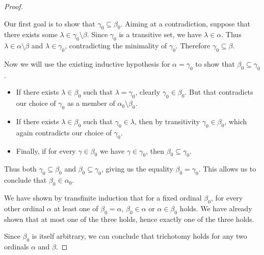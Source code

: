 \begin{proof}
\begin{itemize}
    Our first goal is to show that \( \gamma_0 \subseteq \beta_0 \). Aiming at a contradiction, suppose that there exists some \( \lambda \in \gamma_0 \setminus \beta \). Since \( \gamma_0 \) is a transitive set, we have \( \lambda \in \alpha \). Thus \( \lambda \in \alpha \setminus \beta \) and \( \lambda \in \gamma_0 \), contradicting the minimality of \( \gamma_0 \). Therefore \( \gamma_0 \subseteq \beta \).

    Now we will use the existing inductive hypothesis for \( \alpha = \gamma_0 \) to show that \( \beta_0 \subseteq \gamma_0 \).

    \begin{itemize}
      \item If there exists \( \lambda \in \beta_0 \) such that \( \lambda = \gamma_0 \), clearly \( \gamma_0 \in \beta_0 \). But that contradicts our choice of \( \gamma_0 \) as a member of \( \alpha_0 \setminus \beta_0 \).

      \item If there exists \( \lambda \in \beta_0 \) such that \( \gamma_0 \in \lambda \), then by transitivity \( \gamma_0 \in \beta_0 \), which again contradicts our choice of \( \gamma_0 \).

      \item Finally, if for every \( \gamma \in \beta_0 \) we have \( \gamma \in \gamma_0 \), then \( \beta_0 \subseteq \gamma_0 \).
    \end{itemize}

    Thus both \( \gamma_0 \subseteq \beta_0 \) and \( \beta_0 \subseteq \gamma_0 \), giving us the equality \( \beta_0 = \gamma_0 \). This allows us to conclude that \( \beta_0 \in \alpha_0 \).
  \end{itemize}

  We have shown by transfinite induction that for a fixed ordinal \( \beta_0 \), for every other ordinal \( \alpha \) at least one of \( \beta_0 = \alpha \), \( \beta_0 \in \alpha \) or \( \alpha \in \beta_0 \) holds. We have already shown that at most one of the three holds, hence exactly one of the three holds.

  Since \( \beta_0 \) is itself arbitrary, we can conclude that trichotomy holds for any two ordinals \( \alpha \) and \( \beta \).
\end{proof}

